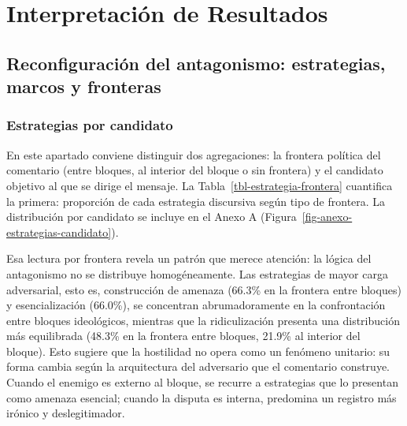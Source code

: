 \documentclass[
  letterpaper,
  numbers=noendperiod,
  fontsize=11pt,
  DIV=12,
  titlepage=false]{scrreprt}
\begin{document}
\chapter{Interpretación de
Resultados}\label{interpretaciuxf3n-de-resultados}

\section{Reconfiguración del antagonismo: estrategias, marcos y
fronteras}\label{reconfiguraciuxf3n-del-antagonismo-estrategias-marcos-y-fronteras}

\subsection{Estrategias por candidato}\label{estrategias-por-candidato}

En este apartado conviene distinguir dos agregaciones: la frontera
política del comentario (entre bloques, al interior del bloque o sin
frontera) y el candidato objetivo al que se dirige el mensaje. La
Tabla~\ref{tbl-estrategia-frontera} cuantifica la primera: proporción de
cada estrategia discursiva según tipo de frontera. La distribución por
candidato se incluye en el Anexo A
(Figura~\ref{fig-anexo-estrategias-candidato}).

Esa lectura por frontera revela un patrón que merece atención: la lógica
del antagonismo no se distribuye homogéneamente. Las estrategias de
mayor carga adversarial, esto es, construcción de amenaza (66.3\% en la
frontera entre bloques) y esencialización (66.0\%), se concentran
abrumadoramente en la confrontación entre bloques ideológicos, mientras
que la ridiculización presenta una distribución más equilibrada (48.3\%
en la frontera entre bloques, 21.9\% al interior del bloque). Esto
sugiere que la hostilidad no opera como un fenómeno unitario: su forma
cambia según la arquitectura del adversario que el comentario construye.
Cuando el enemigo es externo al bloque, se recurre a estrategias que lo
presentan como amenaza esencial; cuando la disputa es interna, predomina
un registro más irónico y deslegitimador.
\end{document}
